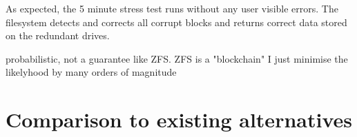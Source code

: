        As expected, the 5 minute stress test runs without any user visible
        errors. The filesystem detects and corrects all corrupt blocks and
        returns correct data stored on the redundant drives.


        probabilistic, not a guarantee like ZFS. ZFS is a "blockchain" I just
        minimise the likelyhood by many orders of magnitude

    \section{Comparison to existing alternatives}
